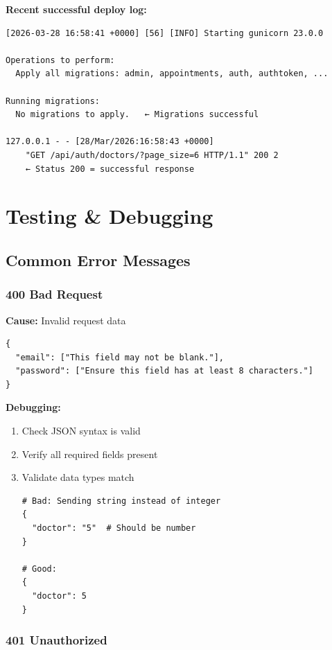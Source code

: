 \documentclass[11pt,a4paper,twoside]{report}
\begin{document}
\textbf{Recent successful deploy log:}

\begin{verbatim}
[2026-03-28 16:58:41 +0000] [56] [INFO] Starting gunicorn 23.0.0

Operations to perform:
  Apply all migrations: admin, appointments, auth, authtoken, ...

Running migrations:
  No migrations to apply.   ← Migrations successful

127.0.0.1 - - [28/Mar/2026:16:58:43 +0000] 
    "GET /api/auth/doctors/?page_size=6 HTTP/1.1" 200 2
    ← Status 200 = successful response
\end{verbatim}

\newpage

\chapter{Testing \& Debugging}

\section{Common Error Messages}

\subsection{400 Bad Request}

\textbf{Cause:} Invalid request data

\begin{verbatim}
{
  "email": ["This field may not be blank."],
  "password": ["Ensure this field has at least 8 characters."]
}
\end{verbatim}

\textbf{Debugging:}
\begin{enumerate}
    \item Check JSON syntax is valid
    \item Verify all required fields present
    \item Validate data types match

\begin{lstlisting}
# Bad: Sending string instead of integer
{
  "doctor": "5"  # Should be number
}

# Good:
{
  "doctor": 5
}
\end{lstlisting}
\end{enumerate}

\subsection{401 Unauthorized}
\end{document}
